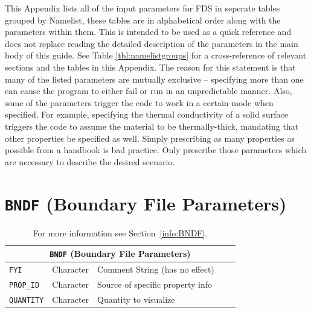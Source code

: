 \documentclass[11pt]{book}
\newcommand{\ct}{\tt\small}
\begin{document}
This Appendix lists all of the input parameters for FDS in seperate tables grouped by Namelist,
these tables are in alphabetical order along with the parameters within them.
This is intended to be used as a quick reference and does not replace reading
the detailed description of the parameters in the main body of this guide.
See Table \ref{tbl:namelistgroups} for a cross-reference of relevant sections and the tables in this Appendix.
The reason for this statement is that many of the listed parameters are mutually exclusive -- specifying more than
one can cause the program to either fail or run in an unpredictable manner. Also, some of the parameters trigger the
code to work in a certain mode when specified. For example, specifying the thermal conductivity of
a solid surface triggers the code to assume the material to be thermally-thick, mandating that other
properties be specified as well. Simply prescribing as many properties as possible from a handbook is bad practice.
Only prescribe those parameters which are necessary to describe the desired scenario.


\clearpage

\section{\texorpdfstring{{\tt BNDF}}{BNDF} (Boundary File Parameters)}

\hspace{0.5in}

\begin{table}[H]
\caption{For more information see Section~\ref{info:BNDF}.}\label{tbl:BNDF}
\noindent
\begin{tabular*}{6.5in}{@{\extracolsep\fill}|l|l|l|l|l|}
\hline
\multicolumn{5}{|c|}{{\ct BNDF} (Boundary File Parameters)} \\ \hline \hline
{\ct FYI}          & Character   & Comment String (has no effect)    &           &     \\ \hline
{\ct PROP\_ID}     & Character   & Source of specific property info  &           &     \\ \hline
{\ct QUANTITY}     & Character   & Quantity to visualize             &           &     \\ \hline
\end{tabular*}
\end{table}


\vspace{\baselineskip}

\vfill
\end{document}
